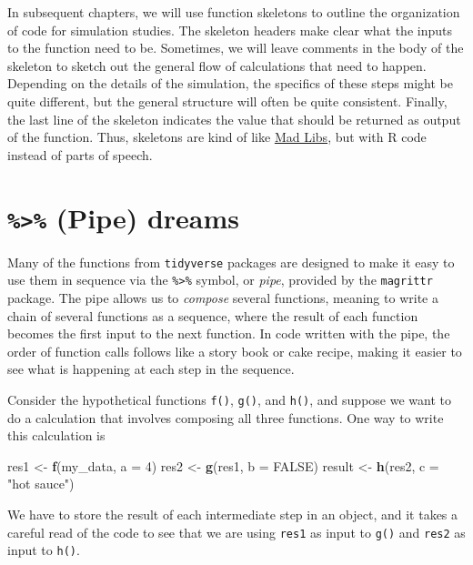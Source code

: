 \documentclass[
]{book}
\newenvironment{Shaded}{\begin{snugshade}}{\end{snugshade}}
\newcommand{\AttributeTok}[1]{\textcolor[rgb]{0.13,0.29,0.53}{#1}}
\newcommand{\ConstantTok}[1]{\textcolor[rgb]{0.56,0.35,0.01}{#1}}
\newcommand{\DecValTok}[1]{\textcolor[rgb]{0.00,0.00,0.81}{#1}}
\newcommand{\FunctionTok}[1]{\textcolor[rgb]{0.13,0.29,0.53}{\textbf{#1}}}
\newcommand{\NormalTok}[1]{#1}
\newcommand{\OtherTok}[1]{\textcolor[rgb]{0.56,0.35,0.01}{#1}}
\newcommand{\StringTok}[1]{\textcolor[rgb]{0.31,0.60,0.02}{#1}}
\begin{document}
In subsequent chapters, we will use function skeletons to outline the organization of code for simulation studies.
The skeleton headers make clear what the inputs to the function need to be.
Sometimes, we will leave comments in the body of the skeleton to sketch out the general flow of calculations that need to happen.
Depending on the details of the simulation, the specifics of these steps might be quite different, but the general structure will often be quite consistent.
Finally, the last line of the skeleton indicates the value that should be returned as output of the function.
Thus, skeletons are kind of like \href{https://www.madlibs.com/}{Mad Libs}, but with R code instead of parts of speech.

\section{\texorpdfstring{\texttt{\%\textgreater{}\%} (Pipe) dreams}{\%\textgreater\% (Pipe) dreams}}\label{pipe-dreams}

Many of the functions from \texttt{tidyverse} packages are designed to make it easy to use them in sequence via the \texttt{\%\textgreater{}\%} symbol, or \emph{pipe}, provided by the \texttt{magrittr} package.
The pipe allows us to \emph{compose} several functions, meaning to write a chain of several functions as a sequence, where the result of each function becomes the first input to the next function.
In code written with the pipe, the order of function calls follows like a story book or cake recipe, making it easier to see what is happening at each step in the sequence.

Consider the hypothetical functions \texttt{f()}, \texttt{g()}, and \texttt{h()}, and suppose we want to do a calculation that involves composing all three functions.
One way to write this calculation is

\begin{Shaded}
\begin{Highlighting}[]
\NormalTok{res1 }\OtherTok{\textless{}{-}} \FunctionTok{f}\NormalTok{(my\_data, }\AttributeTok{a =} \DecValTok{4}\NormalTok{)}
\NormalTok{res2 }\OtherTok{\textless{}{-}} \FunctionTok{g}\NormalTok{(res1, }\AttributeTok{b =} \ConstantTok{FALSE}\NormalTok{)}
\NormalTok{result }\OtherTok{\textless{}{-}} \FunctionTok{h}\NormalTok{(res2, }\AttributeTok{c =} \StringTok{"hot sauce"}\NormalTok{)}
\end{Highlighting}
\end{Shaded}

We have to store the result of each intermediate step in an object, and it takes a careful read of the code to see that we are using \texttt{res1} as input to \texttt{g()} and \texttt{res2} as input to \texttt{h()}.
\end{document}

